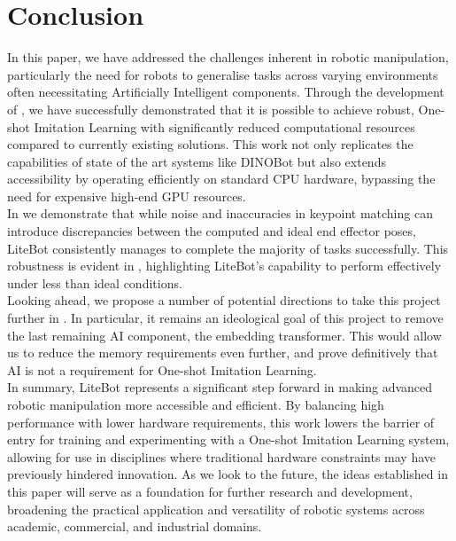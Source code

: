 \chapter{Conclusion}
\label{chap:conclusion}

In this paper, we have addressed the challenges inherent in robotic manipulation, particularly the need for robots to generalise tasks across varying environments often necessitating Artificially Intelligent components. Through the development of , we have successfully demonstrated that it is possible to achieve robust, One-shot Imitation Learning with significantly reduced computational resources compared to currently existing solutions. This work not only replicates the capabilities of state of the art systems like DINOBot \cite{one-shot-imitation} but also extends accessibility by operating efficiently on standard CPU hardware, bypassing the need for expensive high-end GPU resources.\\

In  we demonstrate that while noise and inaccuracies in keypoint matching can introduce discrepancies between the computed and ideal end effector poses, LiteBot consistently manages to complete the majority of tasks successfully. This robustness is evident in , highlighting LiteBot's capability to perform effectively under less than ideal conditions.\\

Looking ahead, we propose a number of potential directions to take this project further in . In particular, it remains an ideological goal of this project to remove the last remaining AI component, the embedding transformer. This would allow us to reduce the memory requirements even further, and prove definitively that AI is not a requirement for One-shot Imitation Learning.\\

In summary, LiteBot represents a significant step forward in making advanced robotic manipulation more accessible and efficient. By balancing high performance with lower hardware requirements, this work lowers the barrier of entry for training and experimenting with a One-shot Imitation Learning system, allowing for use in disciplines where traditional hardware constraints may have previously hindered innovation. As we look to the future, the ideas established in this paper will serve as a foundation for further research and development, broadening the practical application and versatility of robotic systems across academic, commercial, and industrial domains.